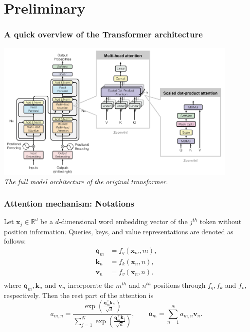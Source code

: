 \documentclass[notheorems,10pt]{beamer}
\def\q{{\mathbf q}}
\def\k{{\mathbf k}}
\def\v{{\mathbf v}}
\def\x{{\mathbf x}}
\begin{document}
\section[Preliminary]{Preliminary}

\begin{frame}
    \frametitle{A quick overview of the Transformer architecture}
    
    \begin{center}
        \includegraphics[width=0.9\textwidth]{attachments/transformer.png}
        \\[1ex]
        \textit{The full model architecture of the original transformer.}
    \end{center}
\end{frame}

\begin{frame}
    \frametitle{Attention mechanism: Notations}

    \pause
    Let $\x_j\in \mathbb{R}^{d}$ be a $d$-dimensional word embedding vector of the $j^{th}$ token without position information. Queries, keys, and value representations are denoted as follows:
    \begin{equation*}
	\begin{aligned}
		\q_m &=f_q(\x_m, m),\\
		\k_n &=f_k(\x_n, n),\\
		\v_n &=f_v(\x_n, n),\\
	\end{aligned}
    \end{equation*}
    where $\q_m,\k_n$ and $ \v_n$ incorporate the $m^{th}$ and $n^{th}$ positions through $f_q,f_k$ and $f_v$, respectively.
    \vfill
    Then the rest part of the attention is
    \begin{equation*}
        a_{m,n} = \frac{\exp\left(\frac{\q_m^{\intercal}\k_n}{\sqrt{d}}\right)}{\sum_{j=1}^{N}\exp\left(\frac{\q_m^{\intercal}\k_j}{\sqrt{d}}\right)},
        \qquad
        \mathbf{o}_m = \sum_{n=1}^{N}a_{m,n}\v_{n}.
    \end{equation*}
\end{frame}
\end{document}
